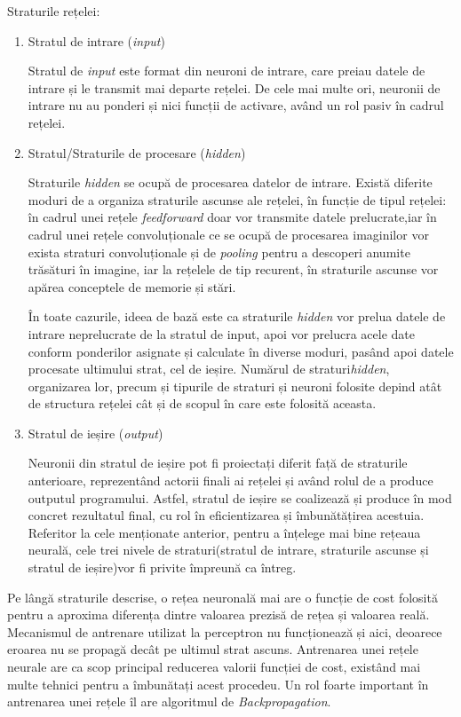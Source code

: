 Straturile rețelei:
\begin{enumerate}
    \item Stratul de intrare (\textit{input})
    
    Stratul de \textit{input} este format din neuroni de intrare, care preiau datele de intrare și le transmit mai departe rețelei. De cele mai multe ori, neuronii de intrare nu au ponderi și nici funcții de activare, având un rol pasiv în cadrul rețelei.
    
    \item Stratul/Straturile de procesare (\textit{hidden})
    
    Straturile \textit{hidden} se ocupă de procesarea datelor de intrare. Există diferite moduri de a organiza straturile ascunse ale rețelei, în funcție de tipul rețelei: în cadrul unei rețele \textit{feedforward} doar vor transmite datele prelucrate,iar în cadrul unei rețele convoluționale ce se ocupă de procesarea imaginilor vor exista straturi convoluționale și de \textit{pooling} pentru a descoperi anumite trăsături în imagine, iar la rețelele de tip recurent, în straturile ascunse vor apărea conceptele de memorie și stări.
    
    În toate cazurile, ideea de bază este ca straturile \textit{hidden} vor prelua datele de intrare neprelucrate de la stratul de input, apoi vor prelucra acele date conform ponderilor asignate și calculate în diverse moduri, pasând apoi datele procesate ultimului strat, cel de ieșire. Numărul de straturi\textit{hidden}, organizarea lor, precum și tipurile de straturi și neuroni folosite depind atât de structura rețelei cât și de scopul în care este folosită aceasta.
    
    \item Stratul de ieșire (\textit{output})
    
    Neuronii din stratul de ieșire pot fi proiectați diferit  față de straturile anterioare, reprezentând actorii finali ai rețelei și având rolul de a produce outputul programului. Astfel, stratul de ieșire se coalizează și produce în mod concret rezultatul final, cu rol în eficientizarea și îmbunătățirea acestuia.
    Referitor la cele menționate anterior, pentru a înțelege mai bine rețeaua neurală, cele trei nivele de straturi(stratul de intrare, straturile ascunse și stratul de ieșire)vor fi privite împreună ca întreg.

\end{enumerate}

Pe lângă straturile descrise, o rețea neuronală mai are o funcție de cost folosită pentru a aproxima diferența dintre valoarea prezisă de rețea și valoarea reală. Mecanismul de antrenare utilizat la perceptron nu funcționează și aici, deoarece eroarea nu se propagă decât pe ultimul strat ascuns. Antrenarea unei rețele neurale are ca scop principal reducerea valorii funcției de cost, existând mai multe tehnici pentru a îmbunătați acest procedeu. Un rol foarte important în antrenarea unei rețele îl are algoritmul de \textit{Backpropagation}.

